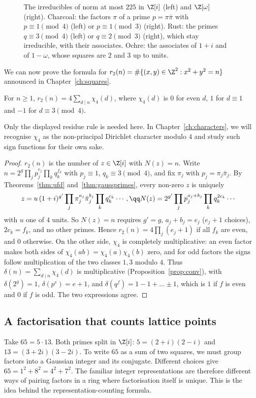 \begin{figure}[ht]
\centering
{}
\caption{The irreducibles of norm at most $225$ in $\Z[i]$ (left) and $\Z[\omega]$ (right). Charcoal: the factors $\pi$ of a prime $p=\pi\bar\pi$ with $p\equiv1\pmod4$ (left) or $p\equiv1\pmod3$ (right). Rust: the primes $q\equiv3\pmod4$ (left) or $q\equiv2\pmod3$ (right), which stay irreducible, with their associates. Ochre: the associates of $1+i$ and of $1-\omega$, whose squares are $2$ and $3$ up to units.}
\label{fig:gausseis}
\end{figure}

We can now prove the formula for $r_2(n)=\#\{(x,y)\in\Z^2:x^2+y^2=n\}$ announced in Chapter~\ref{ch:squares}.

\begin{theorem}[Jacobi]\label{thm:r2}
For $n\ge1$, $r_2(n)=4\displaystyle\sum_{d\mid n}\chi_4(d)$, where $\chi_4(d)$ is $0$ for even $d$, $1$ for $d\equiv1$ and $-1$ for $d\equiv3\pmod4$.
\end{theorem}
Only the displayed residue rule is needed here. In Chapter~\ref{ch:characters}, we will recognise $\chi_4$ as the non-principal Dirichlet character modulo $4$ and study such sign functions for their own sake.
\begin{proof}
$r_2(n)$ is the number of $z\in\Z[i]$ with $N(z)=n$. Write $n=2^g\prod_jp_j^{e_j}\prod_kq_k^{f_k}$ with $p_j\equiv1$, $q_k\equiv3\pmod4$, and fix $\pi_j$ with $p_j=\pi_j\bar\pi_j$. By Theorems~\ref{thm:ufd} and~\ref{thm:gaussprimes}, every non-zero $z$ is uniquely
\[
\begin{gathered}z=u\,(1+i)^{g'}\prod_j\pi_j^{a_j}\bar\pi_j^{b_j}\prod_kq_k^{c_k}\cdots,\qq N(z)=2^{g'}\prod_jp_j^{a_j+b_j}\prod_kq_k^{2c_k}\cdots\end{gathered}
\]
with $u$ one of $4$ units. So $N(z)=n$ requires $g'=g$, $a_j+b_j=e_j$ ($e_j+1$ choices), $2c_k=f_k$, and no other primes. Hence $r_2(n)=4\prod_j(e_j+1)$ if all $f_k$ are even, and $0$ otherwise.
On the other side, $\chi_4$ is completely multiplicative: an even factor makes both sides of $\chi_4(ab)=\chi_4(a)\chi_4(b)$ zero, and for odd factors the signs follow multiplication of the two classes $1,3$ modulo $4$. Thus $\delta(n)=\sum_{d\mid n}\chi_4(d)$ is multiplicative (Proposition~\ref{prop:conv}), with $\delta(2^g)=1$, $\delta(p^e)=e+1$, and $\delta(q^f)=1-1+\dots\pm1$, which is $1$ if $f$ is even and $0$ if $f$ is odd. The two expressions agree.
\end{proof}

\subsection*{A factorisation that counts lattice points}
Take $65=5\cdot13$. Both primes split in $\Z[i]$: $5=(2+i)(2-i)$ and $13=(3+2i)(3-2i)$. To write $65$ as a sum of two squares, we must group factors into a Gaussian integer and its conjugate. Different choices give $65=1^2+8^2=4^2+7^2$. The familiar integer representations are therefore different ways of pairing factors in a ring where factorisation itself is unique. This is the idea behind the representation-counting formula.

